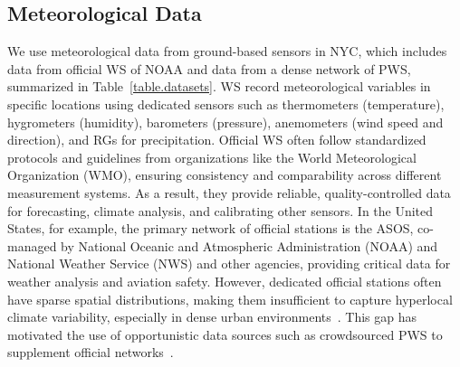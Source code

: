 \documentclass[manuscript]{copernicus}
\begin{document}
\subsection{Meteorological Data}\label{sec:weather-dataset}
We use meteorological data from ground-based sensors in NYC, which includes data from official WS of NOAA and data from a dense network of PWS, summarized in Table~\ref{table.datasets}.
WS record meteorological variables in specific locations using dedicated sensors such as thermometers (temperature), hygrometers (humidity), barometers (pressure), anemometers (wind speed and direction), and RGs for precipitation. 
Official WS often follow standardized protocols and guidelines from organizations like the World Meteorological Organization (WMO), ensuring consistency and comparability across different measurement systems.
As a result, they provide reliable, quality-controlled data for forecasting, climate analysis, and calibrating other sensors. In the United States, for example, the primary network of official stations is the ASOS, co-managed by National Oceanic and Atmospheric Administration (NOAA) and  National Weather Service (NWS) and other agencies, providing critical data for weather analysis and aviation safety.
However, dedicated official stations often have sparse spatial distributions, 
making them insufficient to capture hyperlocal climate variability, especially in dense urban environments~\citep{schilling1991rainfall,cristiano2017spatial}. 
This gap has motivated the use of opportunistic data sources such as 
crowdsourced PWS to supplement official networks~\citep{hahn2022observations, 
de2019quality}.
\end{document}

